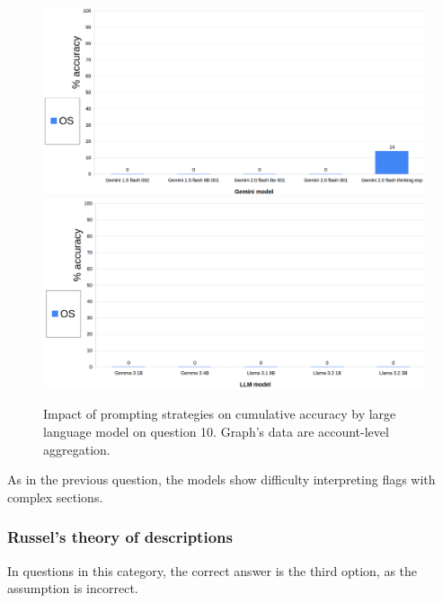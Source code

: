 \documentclass[12pt]{article}
\begin{document}
\begin{figure}[H]
    \centering
            \includegraphics[width=1\textwidth]{q204Gemini.png}
            \includegraphics[width=1\textwidth]{q204Other.png}
    \caption[Accuracy on Question 10 by LLM]{Impact of prompting strategies on cumulative accuracy by large language model on question 10. Graph's data are account-level aggregation.}
    \end{figure} 
As in the previous question, the models show difficulty interpreting flags with complex sections.\\

\vspace{2cm}
\subsubsection{Russel’s theory of descriptions} %
In questions in this category, the correct answer is the third option, as the assumption is incorrect.\\

\end{document}
